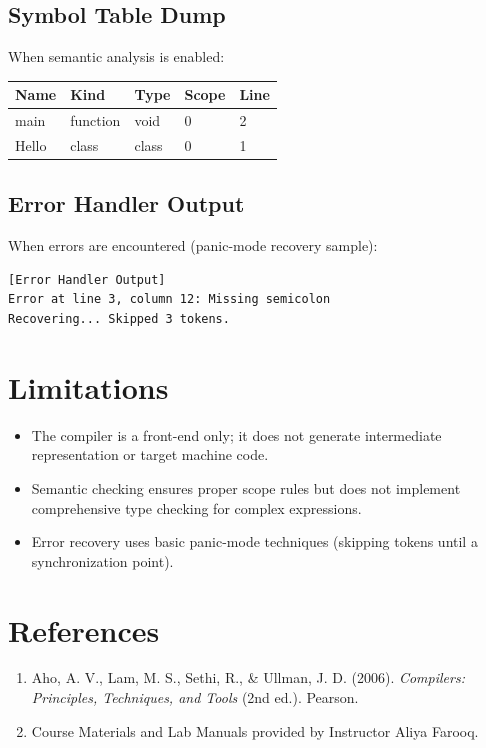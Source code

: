 \documentclass[12pt,a4paper]{article}
\begin{document}
\subsection{Symbol Table Dump}
When semantic analysis is enabled:
\begin{table}[ht]
\centering
\begin{tabular}{|l|l|l|l|l|}
\hline
\textbf{Name} & \textbf{Kind} & \textbf{Type} & \textbf{Scope} & \textbf{Line} \\
\hline
main  & function & void  & 0 & 2 \\
Hello & class    & class & 0 & 1 \\
\hline
\end{tabular}
\end{table}

\subsection{Error Handler Output}
When errors are encountered (panic-mode recovery sample):
\begin{verbatim}
[Error Handler Output]
Error at line 3, column 12: Missing semicolon
Recovering... Skipped 3 tokens.
\end{verbatim}

\section{Limitations}
\begin{itemize}
    \item The compiler is a front-end only; it does not generate intermediate representation or target machine code.
    \item Semantic checking ensures proper scope rules but does not implement comprehensive type checking for complex expressions.
    \item Error recovery uses basic panic-mode techniques (skipping tokens until a synchronization point).
\end{itemize}

\section{References}
\begin{enumerate}
    \item Aho, A. V., Lam, M. S., Sethi, R., \& Ullman, J. D. (2006). \textit{Compilers: Principles, Techniques, and Tools} (2nd ed.). Pearson.
    \item Course Materials and Lab Manuals provided by Instructor Aliya Farooq.
\end{enumerate}
\end{document}
